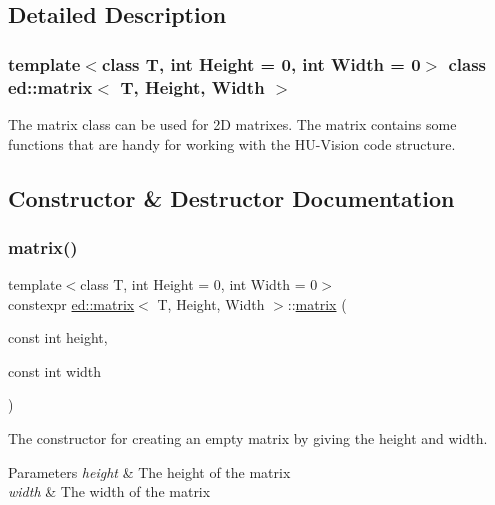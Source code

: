 \subsection{Detailed Description}
\subsubsection*{template$<$class T, int Height = 0, int Width = 0$>$\newline
class ed\+::matrix$<$ T, Height, Width $>$}

The matrix class can be used for 2D matrixes. The matrix contains some functions that are handy for working with the H\+U-\/\+Vision code structure. 

\subsection{Constructor \& Destructor Documentation}
\mbox{\label{classed_1_1matrix_a41874c674fa70fc0d6e6f3cce1825cfe}} 
\subsubsection{\texorpdfstring{matrix()}{matrix()}\hspace{0.1cm}{\footnotesize\ttfamily [1/3]}}
{\footnotesize\ttfamily template$<$class T, int Height = 0, int Width = 0$>$ \\
constexpr \mbox{\hyperlink{classed_1_1matrix}{ed\+::matrix}}$<$ T, Height, Width $>$\+::\mbox{\hyperlink{classed_1_1matrix}{matrix}} (\begin{DoxyParamCaption}\item[{const int}]{height,  }\item[{const int}]{width }\end{DoxyParamCaption})\hspace{0.3cm}{\ttfamily [inline]}}

The constructor for creating an empty matrix by giving the height and width.


\begin{DoxyParams}{Parameters}
{\em height} & The height of the matrix \\
\hline
{\em width} & The width of the matrix \\
\hline
\end{DoxyParams}
\mbox{\label{classed_1_1matrix_ac61570a638973eb5377cbca411ab9492}} 

